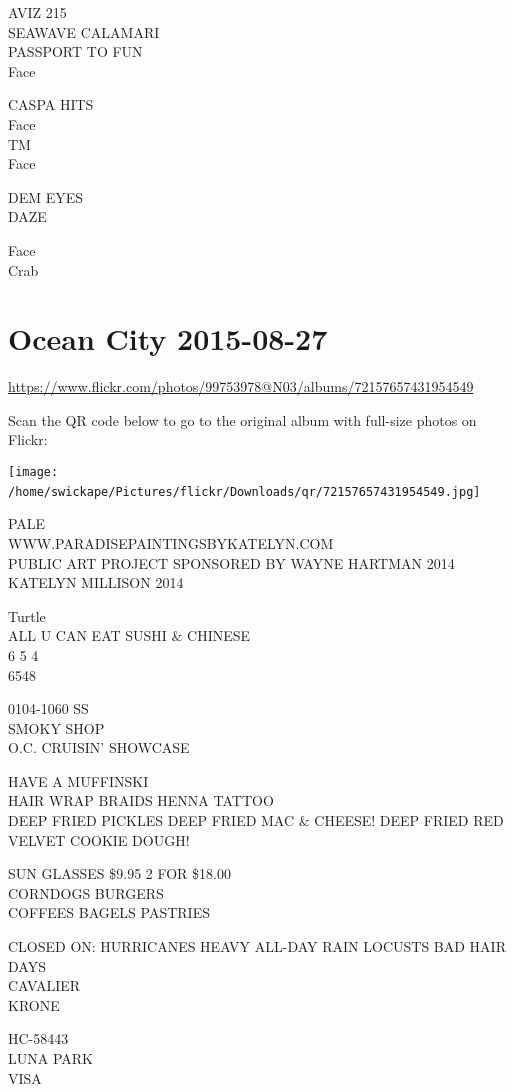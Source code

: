 \documentclass[10pt,letterpaper]{article}
\begin{document}
AVIZ 215\\
SEAWAVE CALAMARI\\
PASSPORT TO FUN\\
Face

CASPA HITS\\
Face\\
TM\\
Face

DEM EYES\\
DAZE

Face\\
Crab
\

\section*{Ocean City 2015-08-27}

\url{https://www.flickr.com/photos/99753978@N03/albums/72157657431954549}

Scan the QR code below to go to the original album with full-size photos on Flickr:

\texttt{[image: /home/swickape/Pictures/flickr/Downloads/qr/72157657431954549.jpg]}
\

PALE\\
WWW.PARADISEPAINTINGSBYKATELYN.COM\\
PUBLIC ART PROJECT SPONSORED BY WAYNE HARTMAN 2014\\
KATELYN MILLISON 2014

Turtle\\
ALL U CAN EAT SUSHI \& CHINESE\\
6 5 4\\
6548

0104{-}1060 SS\\
SMOKY SHOP\\
O.C. CRUISIN' SHOWCASE

HAVE A MUFFINSKI\\
HAIR WRAP BRAIDS HENNA TATTOO\\
DEEP FRIED PICKLES  DEEP FRIED MAC \& CHEESE!  DEEP FRIED RED VELVET COOKIE DOUGH!

SUN GLASSES \$9.95 2 FOR \$18.00\\
CORNDOGS BURGERS\\
COFFEES BAGELS PASTRIES

CLOSED ON: HURRICANES HEAVY ALL{-}DAY RAIN LOCUSTS BAD HAIR DAYS\\
CAVALIER\\
KRONE

HC{-}58443\\
LUNA PARK\\
VISA
\end{document}
